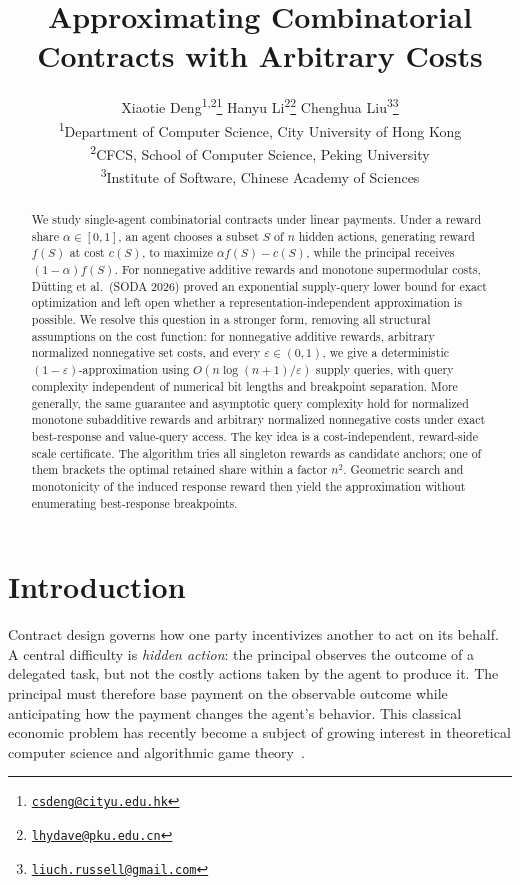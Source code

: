 \documentclass[11pt]{article}
\title{\textbf{Approximating Combinatorial Contracts with Arbitrary Costs}}
\author{Xiaotie Deng\textsuperscript{1,2}\thanks{\href{mailto:csdeng@cityu.edu.hk}{\texttt{csdeng@cityu.edu.hk}}}\quad
Hanyu Li\textsuperscript{2}\thanks{\href{mailto:lhydave@pku.edu.cn}{\texttt{lhydave@pku.edu.cn}}}\quad
Chenghua Liu\textsuperscript{3}\thanks{\href{mailto:liuch.russell@gmail.com}{\texttt{liuch.russell@gmail.com}}}\\[0.5em]
\textsuperscript{1}Department of Computer Science, City University of Hong Kong\\[-0.1em]
\textsuperscript{2}CFCS, School of Computer Science, Peking University\\[-0.1em]
\textsuperscript{3}Institute of Software, Chinese Academy of Sciences}
\date{}
\begin{document}
\maketitle

\begin{abstract}
We study single-agent combinatorial contracts under linear payments. Under a
reward share $\alpha\in[0,1]$, an agent chooses a subset $S$ of $n$ hidden
actions, generating reward $f(S)$ at cost $c(S)$, to maximize
$\alpha f(S)-c(S)$, while the principal receives $(1-\alpha)f(S)$. For
nonnegative additive rewards and monotone supermodular
costs, D\"utting et al.\ (SODA 2026) proved an exponential supply-query lower
bound for exact optimization and left open whether a representation-independent
approximation is possible. We resolve this question in a stronger form,
removing all structural assumptions on the cost function: for nonnegative
additive rewards, arbitrary normalized nonnegative set costs, and every
$\varepsilon\in(0,1)$, we give a deterministic $(1-\varepsilon)$-approximation using
$O(n\log(n+1)/\varepsilon)$ supply queries, with query complexity independent
of numerical bit lengths and breakpoint separation. More generally, the same
guarantee and asymptotic query complexity hold for normalized monotone
subadditive rewards and arbitrary normalized nonnegative costs under exact
best-response and value-query access. The key idea is a cost-independent,
reward-side scale certificate. The algorithm tries all singleton rewards as
candidate anchors; one of them brackets the optimal retained share within a
factor $n^2$. Geometric search and monotonicity of the induced response reward
then yield the approximation without enumerating best-response breakpoints.
\end{abstract}

\section{Introduction}

Contract design governs how one party incentivizes another to act on its
behalf.  A central difficulty is \emph{hidden action}: the principal observes
the outcome of a delegated task, but not the costly actions taken by the
agent to produce it.  The principal must therefore base payment on the
observable outcome while anticipating how the payment changes the agent's
behavior.  This classical economic problem has recently become a subject of
growing interest in theoretical computer science and algorithmic game
theory~\cite{DFT24}.
\end{document}
